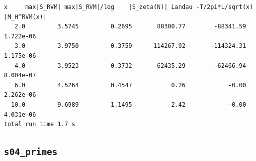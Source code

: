 \documentclass[11pt,reqno]{amsart}
\numberwithin{equation}{section}
\theoremstyle{plain}
\theoremstyle{definition}
\theoremstyle{remark}
\begin{document}
\begin{lstlisting}[style=out]
     x     max|S_RVM| max|S_RVM|/log    |S_zeta(N)| Landau -T/2pi*L/sqrt(x)   |M_H^RVM(x)|
   2.0         3.5745         0.2695       88300.77        -88341.59      1.722e-06
   3.0         3.9750         0.3759      114267.92       -114324.31      1.175e-06
   4.0         3.9523         0.3732       62435.29        -62466.94      8.004e-07
   6.0         4.5264         0.4547           0.26            -0.00      2.262e-06
  10.0         9.6989         1.1495           2.42            -0.00      4.031e-06
total run time 1.7 s
\end{lstlisting}

\subsection{\texttt{s04\_primes}}
\label{app:out-s04-primes}
\end{document}
